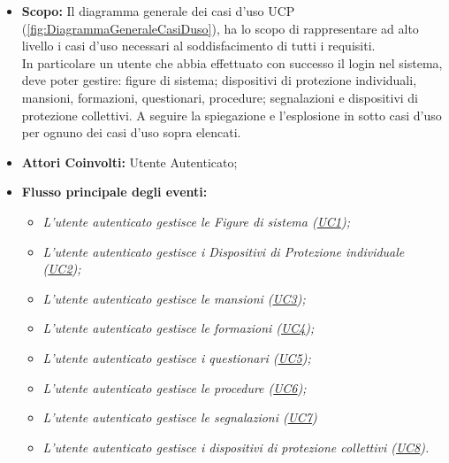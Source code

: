 	\begin{itemize}
		\item \textbf{Scopo:} Il diagramma generale dei casi d'uso UCP (\autoref{fig:DiagrammaGeneraleCasiDuso}), ha lo scopo di rappresentare ad alto livello i casi d'uso necessari al soddisfacimento di tutti i requisiti. \\
		In particolare un utente che abbia effettuato con successo il login nel sistema, deve poter gestire: figure di sistema; dispositivi di protezione individuali, mansioni, formazioni, questionari, procedure; segnalazioni e dispositivi di protezione collettivi.
		A seguire la spiegazione e l'esplosione in sotto casi d'uso per ognuno dei casi d'uso sopra elencati.
		\item \textbf{Attori Coinvolti:} Utente Autenticato;
		\item \textbf{Flusso principale degli eventi:} 
			\begin{itemize}
				\item \textit{L'utente autenticato gestisce le Figure di sistema (\hyperref[section:UC1]{UC1});}
				\item \textit{L'utente autenticato gestisce i Dispositivi di Protezione individuale (\hyperref[section:UC2]{UC2});}
				\item \textit{L'utente autenticato gestisce le mansioni (\hyperref[section:UC3]{UC3});}
				\item \textit{L'utente autenticato gestisce le formazioni (\hyperref[section:UC4]{UC4});}
				\item \textit{L'utente autenticato gestisce i questionari (\hyperref[section:UC5]{UC5});}
				\item \textit{L'utente autenticato gestisce le procedure (\hyperref[section:UC6]{UC6});}
				\item \textit{L'utente autenticato gestisce le segnalazioni (\hyperref[section:UC7]{UC7})}
				\item \textit{L'utente autenticato gestisce i dispositivi di protezione collettivi (\hyperref[section:UC8]{UC8}).}
			\end{itemize}
	\end{itemize}
	

